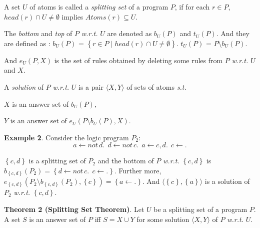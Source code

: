 \documentclass[landscape,final,a0paper,fontscale=0.285]{baposter}
\newtheorem{theorem}{Theorem}
\newenvironment{tight_itemize}{
\begin{itemize}
   \setlength{\itemsep}{0pt}%
  \setlength{\topsep}{0pt}%
  \setlength{\partopsep}{0pt}%
  \setlength{\parskip}{0pt}%
  \setlength{\parsep}{0pt}%
}{\end{itemize}}
\newcommand\st{{\it s.t. }}
\newcommand\wrt{{\it w.r.t. }}
\newcommand{\set}[1]{\left\{#1\right\}}
\newcommand{\Not}{not \,}
\newcommand{\Atom}{Atom\!s}
\begin{document}
\begin{poster}
{%
    A set $U$ of atoms is called a {\em splitting set} of a program $P$, if for each $r \in P$, $head(r) \cap U \neq \emptyset$ implies $\Atom(r) \subseteq U$.
    \par

    The {\em bottom} and {\em top} of $P$ \wrt $U$ are denoted as $b_U(P)$  and $t_U(P)$. And they are defined as :
    $b_U(P)$ = $\set{ r \in P \mid head(r) \cap U \neq \emptyset }$.
    $t_U(P)$ = $P\setminus b_U(P)$.
    \par
    And $e_U(P, X)$ is the set of rules obtained by deleting some rules from $P$ \wrt $U$ and $X$.

    \par
    A {\em solution} of $P$ \wrt $U$ is a pair $\langle X, Y\rangle$ of sets of atoms \st
    \begin{tight_itemize}
      \item $X$ is an answer set of $b_U(P)$,
      \item $Y$ is an answer set of $e_U(P\setminus b_U(P), X)$.
    \end{tight_itemize}

    \smallskip
    {\bf Example 2}. Consider the logic program $P_2$:
     \[   a \gets \Not d.\ \ d \gets \Not c.\ \ a \gets c, d.\ \ c \gets .
     \]
    \par
    $\set{c, d}$ is a splitting set of $P_2$ and the bottom of $P$ \wrt $\set{c,d}$ is $b_{\set{c, d}}(P_2) = \set{ d\gets\Not c.\ \ c\gets.}$. Further more, $e_{\set{c,d}}(P_2\setminus b_{\set{c,d}}(P_2), \set{c}) = \set{ a\gets.}$. And $\langle \set{c}, \set{a}\rangle$ is a solution of $P_2$ \wrt $\set{c,d}$.

    \par
    {\bf Theorem 2 (Splitting Set Theorem)}. Let $U$ be a splitting set of a program $P$. A set $S$ is an answer set of $P$ iff $S = X\cup Y$ for some solution $\langle X, Y\rangle$ of $P$ \wrt $U$.

  }
\end{poster}
\end{document}
